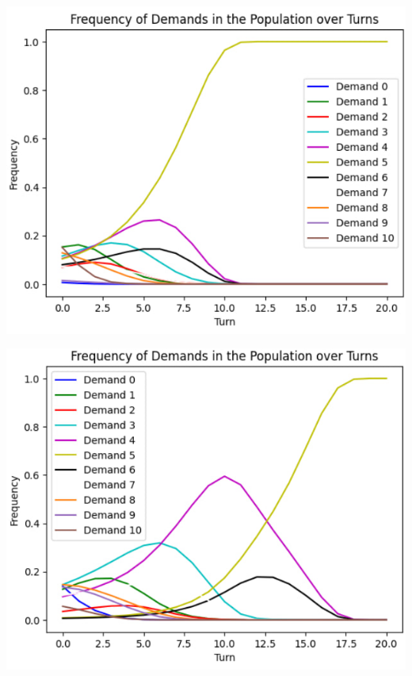 \begin{center}
	\includegraphics{10}
\end{center}

\begin{center}
	\includegraphics{11}
\end{center}

